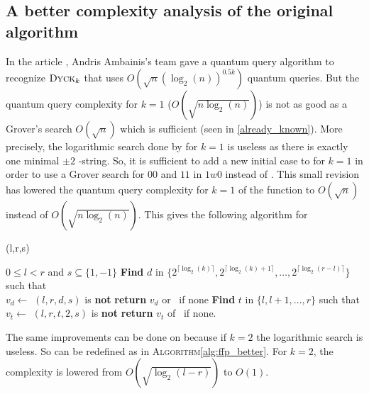 \subsection{A better complexity analysis of the original algorithm}

In the article \cite{art:2DGrid}, Andris Ambainis's team gave a quantum query
algorithm to recognize $\textsc{Dyck$_{k}$}$ that uses $O(\sqrt{n}(\log_2(n))^{0.5k})$
quantum queries. But the quantum query complexity for $k=1$
($O\left(\sqrt{n\log_2(n)}\right)$) is not as good as a Grover's search
$O(\sqrt{n})$ which is sufficient (seen in \autoref{already_known}).
More precisely, the logarithmic search done by  for $k=1$ is useless
as there is exactly one minimal $\pm 2$ -string. So, it is sufficient to
add a new initial case to  for $k = 1$ in order to use a Grover search
for $00$ and $11$ in $1w0$ instead of . This small revision has lowered
the quantum query complexity for $k=1$ of the function to $O(\sqrt{n})$ instead
of $O(\sqrt{n\log_2(n)})$. This gives the following algorithm for 

\begin{algorithm}
    \caption{(l,r,s)}\label{alg:FA_prim}
    \begin{algorithmic}
        \Require $0 \leq l < r$ and $s \subseteq \{1,-1\}$
        \State \textbf{Find} $d$ in $\{2^{\lceil \log_2(k)\rceil }, 2^{\lceil \log_2(k)+1\rceil },\ldots,2^{\lceil \log_2(r-l)\rceil }\}$
        such that \\
        \hspace*{1cm} $v_d \gets $ $(l,r,d,s)$ is \textbf{not} \Null
        \State \textbf{return} $v_d$ or \Null \ if none
        \Else
        \State \textbf{Find} $t$ in $\{l, l+1, \dots, r\}$ such that \\
        \hspace*{1cm} $v_t \gets$ $(l,r,t,2,s)$ is \textbf{not} \Null
        \State \textbf{return} $v_t$ of \Null \ if none.
        \EndIf
    \end{algorithmic}
\end{algorithm}

The same improvements can be done on  because if $k = 2$ the logarithmic
search is useless. So  can be redefined as in
\textsc{Algorithm}\autoref{alg:ffp_better}. For $k=2$, the complexity is
lowered from $O(\sqrt{\log_2(l-r)})$ to $O(1)$.

